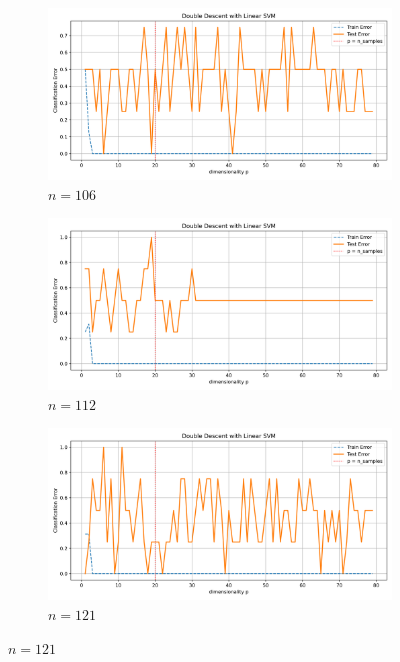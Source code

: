 \documentclass{article}
\begin{document}
\begin{figure}[htb]
  \begin{subfigure}[b]{\imgwidth}
    \includegraphics[width=\linewidth]{img_qq/risk_curve_n80.png}
    \caption{$n=106$}\label{fig:2i}
  \end{subfigure}%
  \hfill
  \begin{subfigure}[b]{\imgwidth}
    \includegraphics[width=\linewidth]{img_qq/risk_curve_n100.png}
    \caption{$n=112$}\label{fig:2j1}
  \end{subfigure}%
  \hfill
  \begin{subfigure}[b]{\imgwidth}
    \includegraphics[width=\linewidth]{img_qq/risk_curve_n120.png}
    \caption{$n=121$}\label{fig:2k1}

\end{subfigure}
\end{figure}
\end{document}
